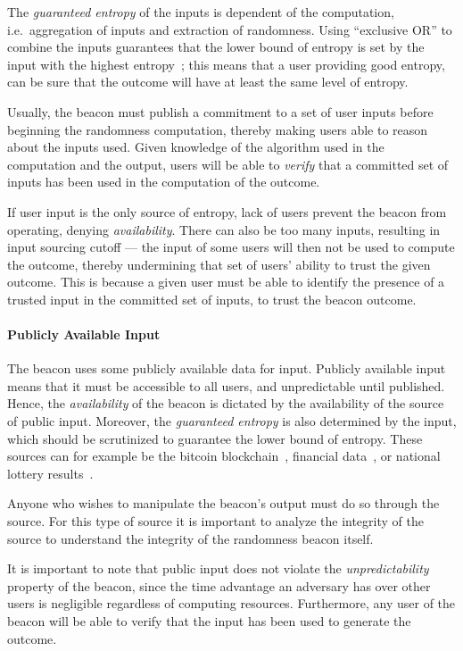 The \emph{guaranteed entropy} of the inputs is dependent of the computation, i.e.\ aggregation of inputs and extraction of randomness.
Using \enquote{exclusive OR} to combine the inputs guarantees that the lower bound of entropy is set by the input with the highest entropy~\cite{lenstra2015random};
this means that a user providing good entropy, can be sure that the outcome will have at least the same level of entropy.

Usually, the beacon must publish a commitment to a set of user inputs before beginning the randomness computation,  thereby making users able to reason about the inputs used.
Given knowledge of the algorithm used in the computation and the output, users will be able to \emph{verify} that a committed set of inputs has been used in the computation of the outcome.

If user input is the only source of entropy, lack of users prevent the beacon from operating, denying \emph{availability}.
There can also be too many inputs, resulting in input sourcing cutoff ---
the input of some users will then not be used to compute the outcome, thereby undermining that set of users' ability to trust the given outcome.
This is because a given user must be able to identify the presence of a trusted input in the committed set of inputs, to trust the beacon outcome.

\paragraph{Publicly Available Input}
The beacon uses some publicly available data for input.
Publicly available input means that it must be accessible to all users, and unpredictable until published.
Hence, the \emph{availability} of the beacon is dictated by the availability of the source of public input.
Moreover, the \emph{guaranteed entropy} is also determined by the input, which should be scrutinized to guarantee the lower bound of entropy.
These sources can for example be the bitcoin blockchain~\cite{bonneau2015bitcoin, bentov2016bitcoin}, financial data~\cite{clark2010use}, or national lottery results~\cite{baigneres2015trap}.

Anyone who wishes to manipulate the beacon's output must do so through the source.
For this type of source it is important to analyze the integrity of the source to understand the integrity of the randomness beacon itself.

It is important to note that public input does not violate the \emph{unpredictability} property of the beacon, since the time advantage an adversary has over other users is negligible regardless of computing resources.
Furthermore, any user of the beacon will be able to verify that the input has been used to generate the outcome.

